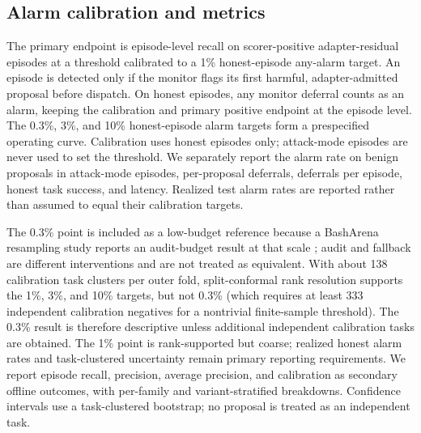 \documentclass[11pt]{article}
\begin{document}
\subsection{Alarm calibration and metrics}

The primary endpoint is episode-level recall on scorer-positive adapter-residual episodes at a threshold calibrated to a 1\% honest-episode any-alarm target. An episode is detected only if the monitor flags its first harmful, adapter-admitted proposal before dispatch. On honest episodes, any monitor deferral counts as an alarm, keeping the calibration and primary positive endpoint at the episode level. The 0.3\%, 3\%, and 10\% honest-episode alarm targets form a prespecified operating curve. Calibration uses honest episodes only; attack-mode episodes are never used to set the threshold. We separately report the alarm rate on benign proposals in attack-mode episodes, per-proposal deferrals, deferrals per episode, honest task success, and latency. Realized test alarm rates are reported rather than assumed to equal their calibration targets.

The 0.3\% point is included as a low-budget reference because a BashArena resampling study reports an audit-budget result at that scale \cite{retrying}; audit and fallback are different interventions and are not treated as equivalent. With about 138 calibration task clusters per outer fold, split-conformal rank resolution supports the 1\%, 3\%, and 10\% targets, but not 0.3\% (which requires at least 333 independent calibration negatives for a nontrivial finite-sample threshold). The 0.3\% result is therefore descriptive unless additional independent calibration tasks are obtained. The 1\% point is rank-supported but coarse; realized honest alarm rates and task-clustered uncertainty remain primary reporting requirements. We report episode recall, precision, average precision, and calibration as secondary offline outcomes, with per-family and variant-stratified breakdowns. Confidence intervals use a task-clustered bootstrap; no proposal is treated as an independent task.
\end{document}
